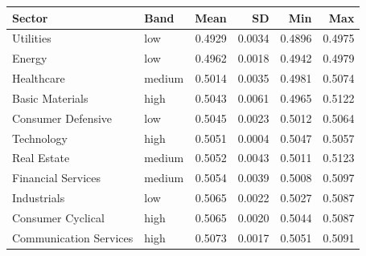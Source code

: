 \begin{tabular}{llrrrr}
\toprule
Sector & Band & Mean & SD & Min & Max \\
\midrule
Utilities & low & 0.4929 & 0.0034 & 0.4896 & 0.4975 \\
Energy & low & 0.4962 & 0.0018 & 0.4942 & 0.4979 \\
Healthcare & medium & 0.5014 & 0.0035 & 0.4981 & 0.5074 \\
Basic Materials & high & 0.5043 & 0.0061 & 0.4965 & 0.5122 \\
Consumer Defensive & low & 0.5045 & 0.0023 & 0.5012 & 0.5064 \\
Technology & high & 0.5051 & 0.0004 & 0.5047 & 0.5057 \\
Real Estate & medium & 0.5052 & 0.0043 & 0.5011 & 0.5123 \\
Financial Services & medium & 0.5054 & 0.0039 & 0.5008 & 0.5097 \\
Industrials & low & 0.5065 & 0.0022 & 0.5027 & 0.5087 \\
Consumer Cyclical & high & 0.5065 & 0.0020 & 0.5044 & 0.5087 \\
Communication Services & high & 0.5073 & 0.0017 & 0.5051 & 0.5091 \\
\bottomrule
\end{tabular}
